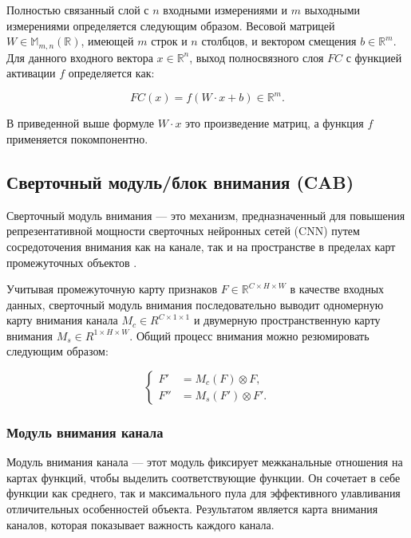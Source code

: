 Полностью связанный слой с \(n\) входными измерениями и \(m\) выходными измерениями определяется следующим образом. Весовой матрицей \(W \in \mathbb{M}_{m,n}(\mathbb{R})\), имеющей \(m\) строк и \(n\) столбцов, и вектором смещения \(b \in \mathbb{R}^{m}\). Для данного входного вектора \(x \in \mathbb{R}^{n}\), выход полносвязного слоя \(FC\) с функцией активации \(f\) определяется как:

\begin{equation}
    FC(x) = f(W \cdot x + b) \in \mathbb{R}^{m}.
\end{equation}

В приведенной выше формуле \(W \cdot x\) это произведение матриц, а функция \(f\) применяется покомпонентно.




\subsection*{Сверточный модуль/блок внимания (CAB)}

Сверточный модуль внимания --- это механизм, предназначенный для повышения репрезентативной мощности сверточных нейронных сетей (CNN) путем сосредоточения внимания как на канале, так и на пространстве в пределах карт промежуточных объектов \cite{woo2018cbam}.

Учитывая промежуточную карту признаков \(F \in \mathbb{R}^{C \times H \times W}\) в качестве входных данных, сверточный модуль внимания последовательно выводит одномерную карту внимания канала \({M}_{c} \in {R}^{C \times 1 \times 1} \) и двумерную пространственную карту внимания \( {M}_{s} \in {R}^{1 \times H \times W} \). Общий процесс внимания можно резюмировать следующим образом:

\begin{equation}
\begin{cases}
	F' & = {M}_{c}(F) \otimes F, \\
	F'' & = {M}_{s}(F') \otimes F'.
\end{cases}
\end{equation}

\subsubsection*{Модуль внимания канала}

Модуль внимания канала --- этот модуль фиксирует межканальные отношения на картах функций, чтобы выделить соответствующие функции. Он сочетает в себе функции как среднего, так и максимального пула для эффективного улавливания отличительных особенностей объекта. Результатом является карта внимания каналов, которая показывает важность каждого канала.

